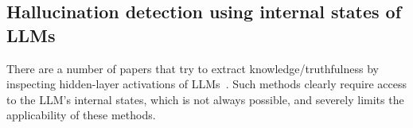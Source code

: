 \subsection{Hallucination detection using internal states of LLMs}

There are a number of papers that try to extract knowledge/truthfulness by inspecting hidden-layer activations of LLMs~\citep{BYKS-2023,azaria2023internal,chen2024inside,chen2024incontext,yin2024characterizing}. Such methods clearly require access to the LLM's internal states, which is not always possible, and severely limits the applicability of these methods.





